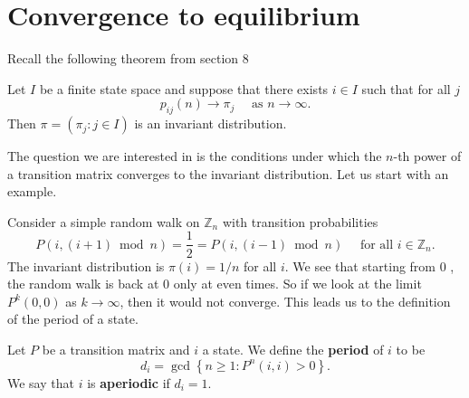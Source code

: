 \documentclass[a4paper]{article}
\begin{document}
\section{Convergence to equilibrium}
Recall the following theorem from section 8 
\begin{theorem}
    Let $I$ be a finite state space and suppose that there exists $i \in I$ such that for all $j$
    \[
    p_{i j}(n) \rightarrow \pi_j \quad \text { as } n \rightarrow \infty .
    \]
    Then $\pi=\left(\pi_j: j \in I\right)$ is an invariant distribution.
\end{theorem}
The question we are interested in is the conditions under which the $n$-th power of a transition matrix converges to the invariant distribution. Let us start with an example.

Consider a simple random walk on $\mathbb{Z}_n$ with transition probabilities
\[
P(i,(i+1) \bmod n)=\frac{1}{2}=P(i,(i-1) \bmod n) \quad \text { for all } i \in \mathbb{Z}_n .
\]
The invariant distribution is $\pi(i)=1 / n$ for all $i$. We see that starting from 0 , the random walk is back at 0 only at even times. So if we look at the limit $P^k(0,0)$ as $k \rightarrow \infty$, then it would not converge. This leads us to the definition of the period of a state.

\begin{definition}
    Let $P$ be a transition matrix and $i$ a state. We define the \textbf{period} of $i$ to be
    \[
    d_i=\gcd\left\{n \geq 1: P^n(i, i)>0\right\} .
    \]
    We say that $i$ is \textbf{aperiodic} if $d_i=1$.
\end{definition}
\end{document}
